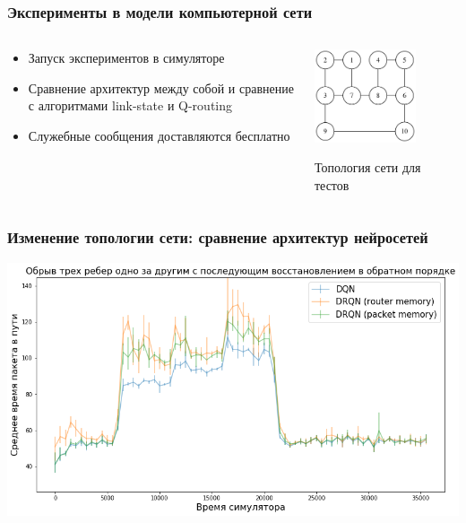 \documentclass{beamer}
\begin{document}

\begin{frame}
  \frametitle{Эксперименты в модели компьютерной сети}
  \begin{columns}
    \begin{column}{0.6\textwidth}
      \begin{itemize}
      \item Запуск экспериментов в симуляторе
      \item Сравнение архитектур между собой и сравнение с алгоритмами link-state и Q-routing
      \item Служебные сообщения доставляются бесплатно
      \end{itemize}
    \end{column}
    \begin{column}{0.4\textwidth}
      \begin{center}
        \includegraphics[width=0.7\textwidth]{graph-2}

        Топология сети для тестов
      \end{center}
    \end{column}
  \end{columns}
\end{frame}


\begin{frame}
  \frametitle{Изменение топологии сети: сравнение архитектур нейросетей}
  \includegraphics[width=\textwidth]{experiment-link-failures-networks} 
\end{frame}
\end{document}
